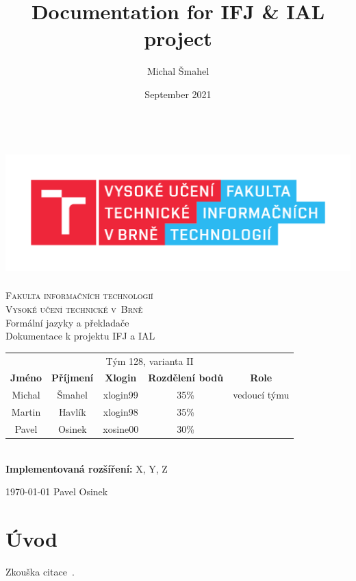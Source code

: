 \documentclass[11pt,a4paper]{article}
\title{Documentation for IFJ \& IAL project}
\author{Michal Šmahel}
\date{September 2021}
\begin{document}
\begin{titlepage}
    \begin{center}
        \includegraphics[height = 160pt]{images/FIT_logo.pdf}\\
		
		{\Huge \textsc{Fakulta informačních technologií}\\[5pt]}
		{\Huge \textsc{Vysoké učení technické v~Brně}}\\
		{\LARGE Formální jazyky a překladače\\[5pt]}
		{\LARGE Dokumentace k projektu IFJ a IAL\\[30pt]}
		
		\begin{tabular}{c c c c c}
		    \multicolumn{5}{c}{Tým 128, varianta II}\\[5pt]
            \textbf{Jméno} & \textbf{Příjmení} & \textbf{Xlogin} & \textbf{Rozdělení bodů} & \textbf{Role}\\
            \hline
            Michal & Šmahel & xlogin99 & 35\% & vedoucí týmu \\[5pt]
            Martin & Havlík & xlogin98 & 35\% &\\[5pt]
            Pavel & Osinek & xosine00 & 30\% & 
        \end{tabular}\\[30pt]
        \textbf{Implementovaná rozšíření:} X, Y, Z
    \end{center}
    {
		\today
		\hfill
		Pavel Osinek
	}
\end{titlepage}

\newpage
\tableofcontents
\newpage

\section{Úvod}
    Zkouška citace~\cite{MedunaAlexander2008Eocd}.
\end{document}
